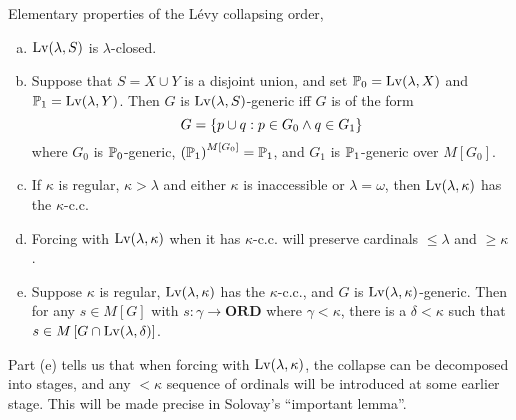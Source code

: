 \begin{lemma} \label{lemma:levy_elementary}
    Elementary properties of the Lévy collapsing order,
    \begin{enumerate}[(a)]
        \item \(\Lv(\lambda,S)\) is \(\lambda\)-closed.
        \item Suppose that \(S = X\cup Y\) is a disjoint union,
            and set \(\P_0 = \Lv(\lambda,X)\) and \(\P_1 = \Lv(\lambda,Y)\).
            Then \(G\) is \(\Lv(\lambda,S)\)-generic iff \(G\) is of the form
            \[G = \set{p\cup q: p\in G_0\land q\in G_1 }\]
            where \(G_0\) is \(\P_0\)-generic, \(\paren{\P_1}^{M[G_0]} = \P_1\),
            and \(G_1\) is \(\P_1\)-generic over \(M[G_0]\).
        \item If \(\kappa\) is regular, \(\kappa > \lambda\) and either \(\kappa\) is inaccessible or \(\lambda = \omega\),
            then \(\Lv(\lambda,\kappa)\) has the \(\kappa\)-c.c.
        \item Forcing with \(\Lv(\lambda,\kappa)\) when it has \(\kappa\)-c.c. will preserve cardinals \(\leq \lambda\) and \(\geq \kappa\).
        \item Suppose \(\kappa\) is regular, \(\Lv(\lambda,\kappa)\) has the \(\kappa\)-c.c., and
            \(G\) is \(\Lv(\lambda,\kappa)\)-generic.
            Then for any \(s\in M[G]\) with \(s:\gamma \to \mathbf{ORD}\) where \(\gamma < \kappa\),
            there is a \(\delta<\kappa\) such that \(s\in M\sq{G\cap\Lv(\lambda,\delta)}\).
    \end{enumerate}
\end{lemma}

\begin{remark}

    Part (e) tells us that when forcing with \(\Lv(\lambda,\kappa)\),
    the collapse can be decomposed into stages, and
    any \(<\kappa\) sequence of ordinals will be introduced at some earlier stage.
    This will be made precise in Solovay's ``important lemma''.
\end{remark}


